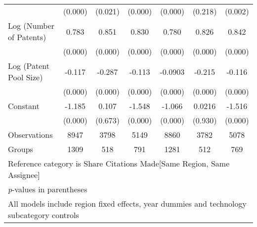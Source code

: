 \begin{table}[htbp]
\begin{adjustbox}{angle=90}
\begin{tabular}{l*{6}{c}}
                &  (0.000)&  (0.021)&  (0.000)&  (0.000)&  (0.218)&  (0.002)\\
Log (Number of Patents)&    0.783&    0.851&    0.830&    0.780&    0.826&    0.842\\
                &  (0.000)&  (0.000)&  (0.000)&  (0.000)&  (0.000)&  (0.000)\\
Log (Patent Pool Size)&   -0.117&   -0.287&   -0.113&  -0.0903&   -0.215&   -0.116\\
                &  (0.000)&  (0.000)&  (0.000)&  (0.000)&  (0.000)&  (0.000)\\
Constant        &   -1.185&    0.107&   -1.548&   -1.066&   0.0216&   -1.516\\
                &  (0.000)&  (0.673)&  (0.000)&  (0.000)&  (0.930)&  (0.000)\\
\hline
Observations    &     8947&     3798&     5149&     8860&     3782&     5078\\
Groups          &     1309&      518&      791&     1281&      512&      769\\
\hline\hline
\multicolumn{7}{l}{\footnotesize Reference category is Share Citations Made[Same Region, Same Assignee]}\\
\multicolumn{7}{l}{\footnotesize \textit{p}-values in parentheses}\\
\multicolumn{7}{l}{\footnotesize All models include region fixed effects, year dummies and technology subcategory controls}\\
\end{tabular}
\end{adjustbox}
\end{table}
